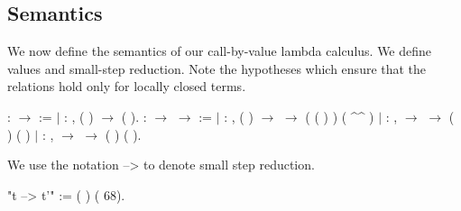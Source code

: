 \documentclass[12pt]{report}
\begin{document}
\begin{coqdoccode}
\coqdocemptyline
\end{coqdoccode}
\subsection{Semantics}



 We now define the semantics of our call-by-value lambda calculus. 
    We define values and small-step reduction. Note the hypotheses 
    which ensure that the relations hold only for locally closed terms. 
\begin{coqdoccode}
\coqdocemptyline
\coqdocnoindent
{}  :  \ensuremath{\rightarrow}  :=\coqdoceol
\coqdocindent{1.00em}
\ensuremath{|}  : \coqdockw{\ensuremath{\forall}} , \coqdoceol
\coqdocindent{3.00em}
 ( ) \ensuremath{\rightarrow}  ( ).\coqdoceol
\coqdocemptyline
\coqdocnoindent
{}  :  \ensuremath{\rightarrow}  \ensuremath{\rightarrow}  :=\coqdoceol
\coqdocindent{1.00em}
\ensuremath{|}  : \coqdockw{\ensuremath{\forall}}  ,\coqdoceol
\coqdocindent{3.00em}
 ( ) \ensuremath{\rightarrow}\coqdoceol
\coqdocindent{3.00em}
  \ensuremath{\rightarrow}\coqdoceol
\coqdocindent{3.00em}
 ( ( ) ) ( \^{}\^{} )\coqdoceol
\coqdocindent{1.00em}
\ensuremath{|}  : \coqdockw{\ensuremath{\forall}}   ,\coqdoceol
\coqdocindent{3.00em}
  \ensuremath{\rightarrow}\coqdoceol
\coqdocindent{3.00em}
   \ensuremath{\rightarrow}\coqdoceol
\coqdocindent{3.00em}
 (  ) (  )\coqdoceol
\coqdocindent{1.00em}
\ensuremath{|}  : \coqdockw{\ensuremath{\forall}}   ,\coqdoceol
\coqdocindent{3.00em}
  \ensuremath{\rightarrow}\coqdoceol
\coqdocindent{3.00em}
   \ensuremath{\rightarrow}\coqdoceol
\coqdocindent{3.00em}
 (  ) (  ).\coqdoceol
\coqdocemptyline
\end{coqdoccode}
We use the notation  -->  to denote small step reduction. 
\begin{coqdoccode}
\coqdocemptyline
\coqdocnoindent
{} "t --> t'" := (  ) (  68).\coqdoceol
\coqdocemptyline
\end{coqdoccode}
\end{document}
